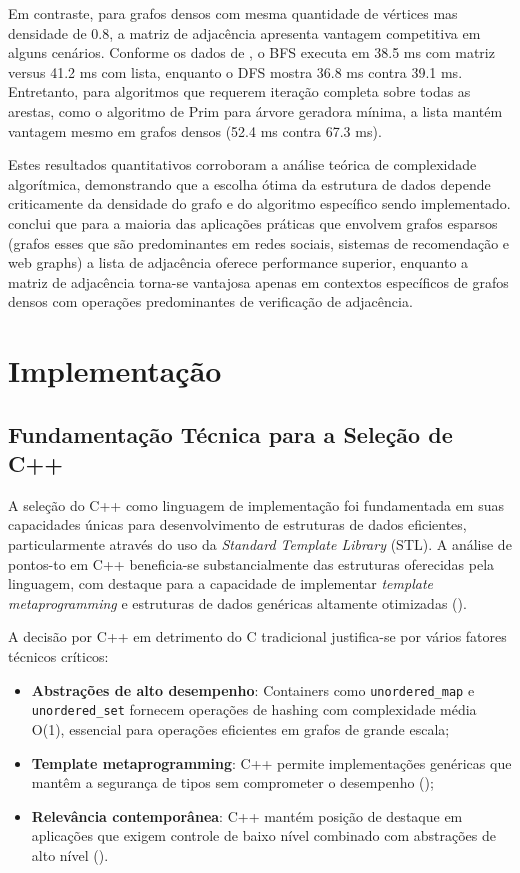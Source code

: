 \documentclass{sbc2023}%
\begin{document}
Em contraste, para grafos densos com mesma quantidade de vértices mas densidade de 0.8, a matriz de adjacência apresenta vantagem competitiva em alguns cenários. Conforme os dados de \cite{valiente2022adjacency}, o BFS executa em 38.5 ms com matriz versus 41.2 ms com lista, enquanto o DFS mostra 36.8 ms contra 39.1 ms. Entretanto, para algoritmos que requerem iteração completa sobre todas as arestas, como o algoritmo de Prim para árvore geradora mínima, a lista mantém vantagem mesmo em grafos densos (52.4 ms contra 67.3 ms).

Estes resultados quantitativos corroboram a análise teórica de complexidade algorítmica, demonstrando que a escolha ótima da estrutura de dados depende criticamente da densidade do grafo e do algoritmo específico sendo implementado. \cite{valiente2022adjacency} conclui que para a maioria das aplicações práticas que envolvem grafos esparsos (grafos esses que são predominantes em redes sociais, sistemas de recomendação e web graphs) a lista de adjacência oferece performance superior, enquanto a matriz de adjacência torna-se vantajosa apenas em contextos específicos de grafos densos com operações predominantes de verificação de adjacência.

\section{Implementação}
\subsection{Fundamentação Técnica para a Seleção de C++}

A seleção do C++ como linguagem de implementação foi fundamentada em suas capacidades únicas para desenvolvimento de estruturas de dados eficientes, particularmente através do uso da \textit{Standard Template Library} (STL). A análise de pontos-to em C++ beneficia-se substancialmente das estruturas oferecidas pela linguagem, com destaque para a capacidade de implementar \textit{template metaprogramming} e estruturas de dados genéricas altamente otimizadas (\cite{ref2}).

A decisão por C++ em detrimento do C tradicional justifica-se por vários fatores técnicos críticos:

\begin{itemize}
\item \textbf{Abstrações de alto desempenho}: Containers como  \texttt{unordered\_map} e  \texttt{unordered\_set} fornecem operações de hashing com complexidade média O(1), essencial para operações eficientes em grafos de grande escala;
\item \textbf{Template metaprogramming}: C++ permite implementações genéricas que mantêm a segurança de tipos sem comprometer o desempenho (\cite{ref2});
\item \textbf{Relevância contemporânea}: C++ mantém posição de destaque em aplicações que exigem controle de baixo nível combinado com abstrações de alto nível (\cite{ref4}).
\end{itemize}
\end{document}
